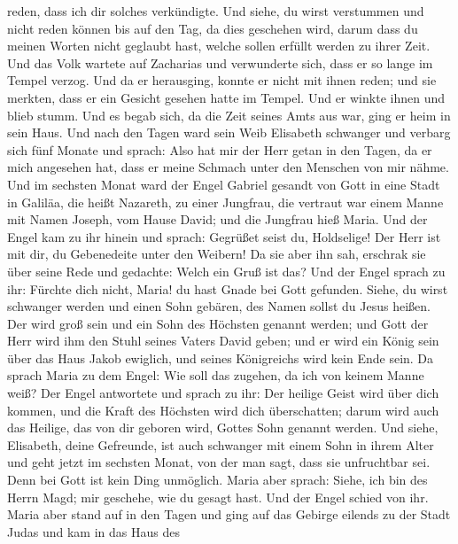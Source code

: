reden, dass ich dir solches verkündigte.  Und siehe, du
wirst verstummen und nicht reden können bis auf den Tag, da dies
geschehen wird, darum dass du meinen Worten nicht geglaubt hast, welche
sollen erfüllt werden zu ihrer Zeit.  Und das Volk wartete
auf Zacharias und verwunderte sich, dass er so lange im Tempel verzog.
 Und da er herausging, konnte er nicht mit ihnen reden; und
sie merkten, dass er ein Gesicht gesehen hatte im Tempel. Und er winkte
ihnen und blieb stumm.  Und es begab sich, da die Zeit
seines Amts aus war, ging er heim in sein Haus.  Und nach
den Tagen ward sein Weib Elisabeth schwanger und verbarg sich fünf
Monate und sprach:  Also hat mir der Herr getan in den
Tagen, da er mich angesehen hat, dass er meine Schmach unter den
Menschen von mir nähme.  Und im sechsten Monat ward der
Engel Gabriel gesandt von Gott in eine Stadt in Galiläa, die heißt
Nazareth,  zu einer Jungfrau, die vertraut war einem Manne
mit Namen Joseph, vom Hause David; und die Jungfrau hieß Maria.
 Und der Engel kam zu ihr hinein und sprach: Gegrüßet seist
du, Holdselige! Der Herr ist mit dir, du Gebenedeite unter den Weibern!
 Da sie aber ihn sah, erschrak sie über seine Rede und
gedachte: Welch ein Gruß ist das?  Und der Engel sprach zu
ihr: Fürchte dich nicht, Maria! du hast Gnade bei Gott gefunden.
 Siehe, du wirst schwanger werden und einen Sohn gebären,
des Namen sollst du Jesus heißen.  Der wird groß sein und
ein Sohn des Höchsten genannt werden; und Gott der Herr wird ihm den
Stuhl seines Vaters David geben;  und er wird ein König
sein über das Haus Jakob ewiglich, und seines Königreichs wird kein Ende
sein.  Da sprach Maria zu dem Engel: Wie soll das zugehen,
da ich von keinem Manne weiß?  Der Engel antwortete und
sprach zu ihr: Der heilige Geist wird über dich kommen, und die Kraft
des Höchsten wird dich überschatten; darum wird auch das Heilige, das
von dir geboren wird, Gottes Sohn genannt werden.  Und
siehe, Elisabeth, deine Gefreunde, ist auch schwanger mit einem Sohn in
ihrem Alter und geht jetzt im sechsten Monat, von der man sagt, dass sie
unfruchtbar sei.  Denn bei Gott ist kein Ding unmöglich.
 Maria aber sprach: Siehe, ich bin des Herrn Magd; mir
geschehe, wie du gesagt hast. Und der Engel schied von ihr.
 Maria aber stand auf in den Tagen und ging auf das Gebirge
eilends zu der Stadt Judas  und kam in das Haus des
